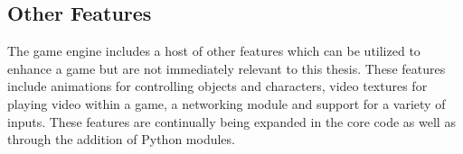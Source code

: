 \subsection{Other Features}

The game engine includes a host of other features which can be utilized to
enhance a game but are not immediately relevant to this thesis. These features
include animations for controlling objects and characters, video textures for
playing video within a game, a networking module and support for a variety of
inputs. These features are continually being expanded in the core code as well as through
the addition of Python modules. 





